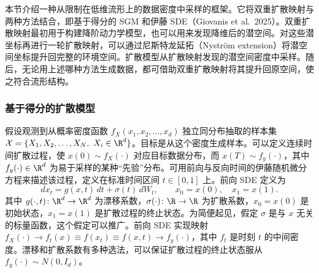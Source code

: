 本节介绍一种从限制在低维流形上的数据密度中采样的框架。它将双重扩散映射与两种方法结合，即基于得分的 SGM 和伊藤 SDE（Giovanis et al.\ 2025）。双重扩散映射最初用于构建降阶动力学模型，也可以用来发现降维后的潜空间。对这些潜坐标再进行一轮扩散映射，可以通过尼斯特龙延拓（Nyström extension）将潜空间坐标提升回完整的环境空间。扩散模型从扩散映射发现的潜空间密度中采样。随后，无论用上述哪种方法生成数据，都可借助双重扩散映射将其提升回原空间，使之符合流形结构。

\subsubsection{基于得分的扩散模型}

假设观测到从概率密度函数 $f_X(x_1,x_2,\ldots,x_d)$ 独立同分布抽取的样本集 $\mathcal X=\{X_1,X_2,\ldots,X_N,\ X_i\in\R^d\}$。目标是从这个密度生成样本。可以定义连续时间扩散过程，使 $x(0)\sim f_X(\cdot)$ 对应目标数据分布，而 $x(T)\sim f_y(\cdot)$，其中 $f_y(\cdot)\in\R^d$ 为易于采样的某种“先验”分布。可用前向与反向时间的伊藤随机微分方程来描述该过程，定义在标准时间区间 $t\in[0,1]$ 上。前向 SDE 定义为
\begin{equation*}
  dx_t=g(x,t)\,dt+\sigma(t)\,dW_t,\qquad x_0=x(0),\quad x_1=x(1).
  \tag{6.45}\label{eq:6.45}
\end{equation*}
其中 $g(\cdot,t)\colon\R^d\to\R^d$ 为漂移系数，$\sigma(\cdot)\colon\R\to\R$ 为扩散系数，$x_0=x(0)$ 是初始状态，$x_1=x(1)$ 是扩散过程的终止状态。为简便起见，假定 $\sigma$ 是与 $x$ 无关的标量函数，这个假定可以推广。前向 SDE 实现映射 $f_X(\cdot)\to f_t(x)\equiv f(x_t)\equiv f(x,t)\to f_y(\cdot)$，其中 $f_t$ 是时刻 $t$ 的中间密度。漂移和扩散系数有多种选法，可以保证扩散过程的终止状态服从 $f_y(\cdot)\sim N(0,I_d)$。

